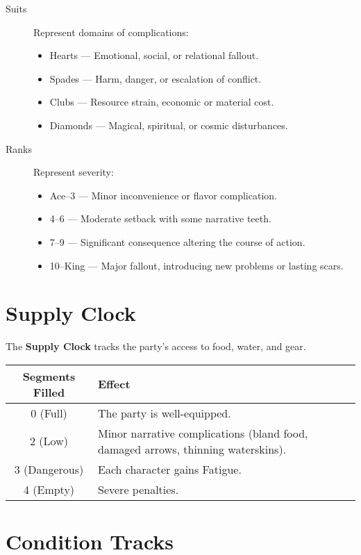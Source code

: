 \begin{description}
  \item[Suits] Represent domains of complications:
    \begin{itemize}
      \item Hearts — Emotional, social, or relational fallout.
      \item Spades — Harm, danger, or escalation of conflict.
      \item Clubs — Resource strain, economic or material cost.
      \item Diamonds — Magical, spiritual, or cosmic disturbances.
    \end{itemize}
  \item[Ranks] Represent severity:
    \begin{itemize}
      \item Ace–3 — Minor inconvenience or flavor complication.
      \item 4–6 — Moderate setback with some narrative teeth.
      \item 7–9 — Significant consequence altering the course of action.
      \item 10–King — Major fallout, introducing new problems or lasting scars.
    \end{itemize}
\end{description}

\section{Supply Clock}

The \textbf{Supply Clock} tracks the party's access to food, water, and gear.

\begin{center}
\begin{tabular}{cl}
\toprule
\textbf{Segments Filled} & \textbf{Effect} \\
\midrule
0 (Full) & The party is well-equipped. \\
2 (Low) & Minor narrative complications (bland food, damaged arrows, thinning waterskins). \\
3 (Dangerous) & Each character gains Fatigue. \\
4 (Empty) & Severe penalties. \\
\bottomrule
\end{tabular}
\end{center}

\section{Condition Tracks}

